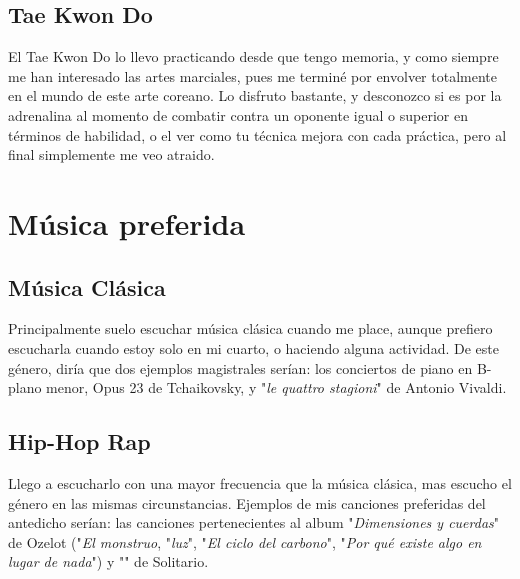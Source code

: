 \documentclass[letterpaper, 12pt]{article}
\begin{document}
  \subsection{\large{Tae Kwon Do}}
  El Tae Kwon Do lo llevo practicando desde que tengo memoria, y como siempre me han interesado las artes marciales, pues me termin\'e por envolver totalmente en el mundo de este arte coreano. Lo disfruto bastante, y desconozco si es por la adrenalina al momento de combatir contra un oponente igual o superior en t\'erminos de habilidad, o el ver como tu t\'ecnica mejora con cada pr\'actica, pero al final simplemente me veo atraido.

\newpage
\section{\Large{M\'usica preferida}}
  \subsection{\large{M\'usica Cl\'asica}}
  Principalmente suelo escuchar m\'usica cl\'asica cuando me place, aunque prefiero escucharla cuando estoy solo en mi cuarto, o haciendo alguna actividad. De este g\'enero, dir\'ia que dos ejemplos magistrales ser\'ian: los conciertos de piano en B-plano menor, Opus 23 de Tchaikovsky, y "\textit{le quattro stagioni}" de Antonio Vivaldi.


  \subsection{\large{Hip-Hop Rap}}
  Llego a escucharlo con una mayor frecuencia que la m\'usica cl\'asica, mas escucho el g\'enero en las mismas circunstancias. Ejemplos de mis canciones preferidas del antedicho ser\'ian: las canciones pertenecientes al album "\textit{Dimensiones y cuerdas}" de Ozelot ("\textit{El monstruo}, "\textit{luz}", "\textit{El ciclo del carbono}", "\textit{Por qu\'e existe algo en lugar de nada}") y "" de Solitario.
\end{document}
